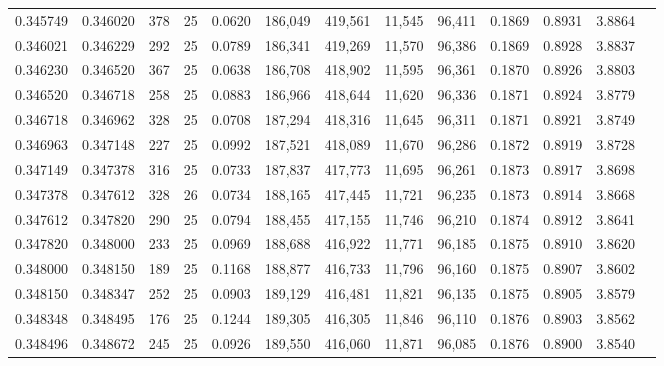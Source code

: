 \begin{tabular}{rrrrrrrrrrrrr}
0.345749 & 0.346020 &   378 &  25 &                                     0.0620 & 186,049 & 419,561 &  11,545 &  96,411 & 0.1869 & 0.8931 & 3.8864 \\
0.346021 & 0.346229 &   292 &  25 &                                     0.0789 & 186,341 & 419,269 &  11,570 &  96,386 & 0.1869 & 0.8928 & 3.8837 \\
0.346230 & 0.346520 &   367 &  25 &                                     0.0638 & 186,708 & 418,902 &  11,595 &  96,361 & 0.1870 & 0.8926 & 3.8803 \\
0.346520 & 0.346718 &   258 &  25 &                                     0.0883 & 186,966 & 418,644 &  11,620 &  96,336 & 0.1871 & 0.8924 & 3.8779 \\
0.346718 & 0.346962 &   328 &  25 &                                     0.0708 & 187,294 & 418,316 &  11,645 &  96,311 & 0.1871 & 0.8921 & 3.8749 \\
0.346963 & 0.347148 &   227 &  25 &                                     0.0992 & 187,521 & 418,089 &  11,670 &  96,286 & 0.1872 & 0.8919 & 3.8728 \\
0.347149 & 0.347378 &   316 &  25 &                                     0.0733 & 187,837 & 417,773 &  11,695 &  96,261 & 0.1873 & 0.8917 & 3.8698 \\
0.347378 & 0.347612 &   328 &  26 &                                     0.0734 & 188,165 & 417,445 &  11,721 &  96,235 & 0.1873 & 0.8914 & 3.8668 \\
0.347612 & 0.347820 &   290 &  25 &                                     0.0794 & 188,455 & 417,155 &  11,746 &  96,210 & 0.1874 & 0.8912 & 3.8641 \\
0.347820 & 0.348000 &   233 &  25 &                                     0.0969 & 188,688 & 416,922 &  11,771 &  96,185 & 0.1875 & 0.8910 & 3.8620 \\
0.348000 & 0.348150 &   189 &  25 &                                     0.1168 & 188,877 & 416,733 &  11,796 &  96,160 & 0.1875 & 0.8907 & 3.8602 \\
0.348150 & 0.348347 &   252 &  25 &                                     0.0903 & 189,129 & 416,481 &  11,821 &  96,135 & 0.1875 & 0.8905 & 3.8579 \\
0.348348 & 0.348495 &   176 &  25 &                                     0.1244 & 189,305 & 416,305 &  11,846 &  96,110 & 0.1876 & 0.8903 & 3.8562 \\
0.348496 & 0.348672 &   245 &  25 &                                     0.0926 & 189,550 & 416,060 &  11,871 &  96,085 & 0.1876 & 0.8900 & 3.8540 \\

\end{tabular}
